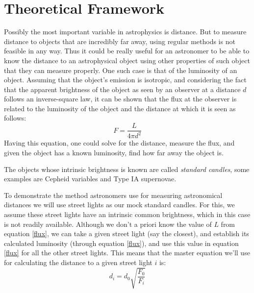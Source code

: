 \documentclass[aps,rmp,twocolumn,nofootinbib,superscriptaddress,floatfix,longbibliography]{revtex4-2}
\begin{document}
\section{Theoretical Framework}

Possibly the most important variable in astrophysics is distance. But to measure distance to objects that are incredibly far away, using regular methods is not feasible in any way. Thus it could be really useful for an astronomer to be able to know the distance to an astrophysical object using other properties of such object that they can measure properly. One such case is that of the luminosity of an object. Assuming  that the object's emission is isotropic, and considering the fact that the apparent brightness of the object as seen by an observer at a distance $d$ follows an inverse-square law, it can be shown that the flux at the observer is related to the luminosity of the object and the distance at which it is seen as follows:
\begin{equation}
    F = \frac{L}{4 \pi d^2}
    \label{flux}
\end{equation}
Having this equation, one could solve for the distance, measure the flux, and given the object has a known luminosity, find how far away the object is.

The objects whose intrinsic brightness is known are called \textit{standard candles}, some examples are Cepheid variables and Type IA supernovae.

To demonstrate the method astronomers use for measuring astronomical distances we will use street lights as our mock standard candles. For this, we assume these street lights have an intrinsic common brightness, which in this case is not readily available. Although we don't a priori know the value of $L$ from equation \eqref{flux}, we can take a given street light (say the closest), and establish its calculated luminosity (through equation \eqref{flux}), and use this value in equation \eqref{flux} for all the other street lights. This means that the master equation we'll use for calculating the distance to a given street light $i$ is:
\begin{equation}
    d_i = d_0 \sqrt{\frac{F_0}{F_i}}
    \label{dist}
\end{equation}
\end{document}
